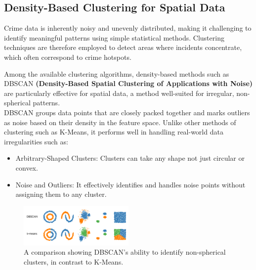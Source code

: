 \documentclass[12pt,a4paper,oneside,english]{book}
\begin{document}
\subsection{Density-Based Clustering for Spatial Data}%
\label{sec:dbscan_theory}
Crime data is inherently noisy and unevenly distributed, making it challenging to identify meaningful patterns using simple statistical methods. Clustering techniques are therefore employed to detect areas 
where incidents concentrate, which often correspond to crime hotspots.

Among the available clustering algorithms, density-based methods such as DBSCAN \textbf{(Density-Based Spatial Clustering of Applications with Noise) } \cite{BIRANT2007208dbscan} are particularly effective for spatial data, a method well-suited for irregular,
 non-spherical patterns.
 \\
DBSCAN groups data points that are closely packed together and marks outliers as noise based on their density in the feature space.
Unlike other methods of clustering such as K-Means, it performs well in handling real-world data irregularities such as:
\begin{itemize}
    \item Arbitrary-Shaped Clusters: Clusters can take any shape not just circular or convex.
    \item Noise and Outliers: It effectively identifies and handles noise points without assigning them to any cluster.
\end{itemize}

\begin{figure}[h!] %
    \centering
    \includegraphics[width=0.5\textwidth]{images/dbscanVSkmeans.png}
    \captionsetup{width=0.6\textwidth}
    \caption{A comparison showing DBSCAN's ability to identify non-spherical clusters, in contrast to K-Means.}
    \label{fig:dbscan_vs_kmeans}
\end{figure}
\end{document}
